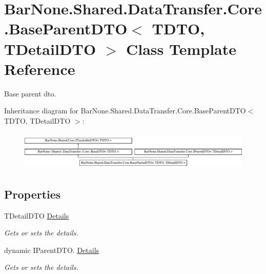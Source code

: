 \hypertarget{class_bar_none_1_1_shared_1_1_data_transfer_1_1_core_1_1_base_parent_d_t_o}{}\section{Bar\+None.\+Shared.\+Data\+Transfer.\+Core.\+Base\+Parent\+D\+TO$<$ T\+D\+TO, T\+Detail\+D\+TO $>$ Class Template Reference}
\label{class_bar_none_1_1_shared_1_1_data_transfer_1_1_core_1_1_base_parent_d_t_o}


Base parent dto.  


Inheritance diagram for Bar\+None.\+Shared.\+Data\+Transfer.\+Core.\+Base\+Parent\+D\+TO$<$ T\+D\+TO, T\+Detail\+D\+TO $>$\+:\begin{figure}[H]
\begin{center}
\leavevmode
\includegraphics[height=1.862528cm]{class_bar_none_1_1_shared_1_1_data_transfer_1_1_core_1_1_base_parent_d_t_o}
\end{center}
\end{figure}
\subsection*{Properties}
\begin{DoxyCompactItemize}
\item 
T\+Detail\+D\+TO \mbox{\hyperlink{class_bar_none_1_1_shared_1_1_data_transfer_1_1_core_1_1_base_parent_d_t_o_ad96233dd2fec5a0191ebd4ff0d53488e}{Details}}
\begin{DoxyCompactList}\small\item\em Gets or sets the details. \end{DoxyCompactList}\item 
dynamic I\+Parent\+D\+T\+O. \mbox{\hyperlink{class_bar_none_1_1_shared_1_1_data_transfer_1_1_core_1_1_base_parent_d_t_o_a1a156f067a313c34939213ca31d2f869}{Details}}
\begin{DoxyCompactList}\small\item\em Gets or sets the details. \end{DoxyCompactList}\end{DoxyCompactItemize}



